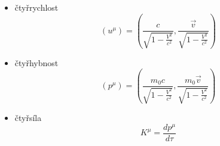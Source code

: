 \documentclass[a5paper,12pt]{article}
\begin{document}
\begin{itemize}
	\item čtyřrychlost 
	\begin{equation*}
		(u^\mu) = \left(\frac{c}{\sqrt{1 - \frac{V^2}{c^2}}}, \frac{\vec{v}}{\sqrt{1 - \frac{V^2}{c^2}}}\right)
	\end{equation*}
	
	\item čtyřhybnost 
	\begin{equation*}
		(p^\mu) = \left(\frac{m_0 c}{\sqrt{1 - \frac{V^2}{c^2}}}, \frac{m_0 \vec{v}}{\sqrt{1 - \frac{V^2}{c^2}}}\right)
	\end{equation*}
	
	\item čtyřsíla
	\begin{equation*}
		K^{\mu} = \frac{d p^{\mu}}{d \tau} 
	\end{equation*}

\end{itemize}
\end{document}
